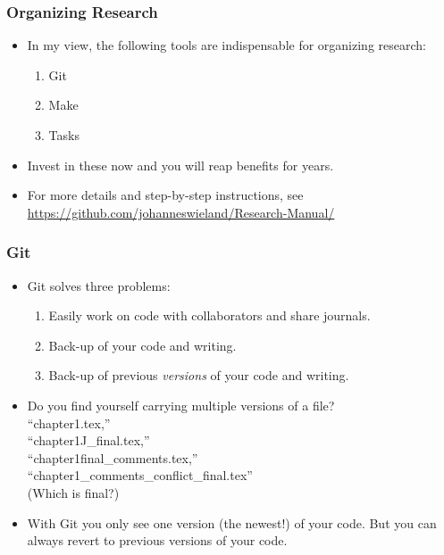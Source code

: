 \documentclass[english,xcolor=svgnames]{beamer}
\begin{document}
\begin{frame}
\frametitle[alignment=center]{Organizing Research}
\begin{itemize}
	\item In my view, the following tools are indispensable for organizing research: 
	\begin{enumerate}
	\item Git
	\item Make
	\item Tasks
\end{enumerate}
\item Invest in these now and you will reap benefits for years.
\item For more details and step-by-step instructions, see \href{https://github.com/johanneswieland/Research-Manual/}{https://github.com/johanneswieland/Research-Manual/}
\end{itemize}
\end{frame}


\begin{frame}
\frametitle[alignment=center]{Git}
\begin{itemize}
	\item Git solves three problems:
	\begin{enumerate}
		\item Easily work on code with collaborators and share journals.
		\item Back-up of your code and writing.
		\item Back-up of previous \emph{versions} of your code and writing.
	\end{enumerate}
	\item Do you find yourself carrying multiple versions of a file? \\ ``chapter1.tex,'' \\ ``chapter1J\_final.tex,''  \\ ``chapter1final\_comments.tex,'' \\ ``chapter1\_comments\_conflict\_final.tex''\\
	 (Which is final?)
	 \item With Git you only see one version (the newest!) of your code. But you can always revert to previous versions of your code.
\end{itemize}
\end{frame}
\end{document}
